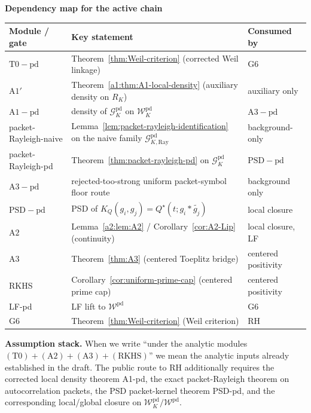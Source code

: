 \begin{center}
  \small\textbf{Dependency map for the active chain}
\end{center}
\begin{center}
  \small
  \begin{tabular}{lll}
    \hline
    Module / gate & Key statement & Consumed by \\
    \hline
    $\mathrm{T0\!-\!pd}$ & Theorem~\ref{thm:Weil-criterion} (corrected Weil linkage) & $\mathrm{G6}$ \\
    $\mathrm{A1'}$ & Theorem~\ref{a1:thm:A1-local-density} (auxiliary density on $R_K$) & auxiliary only \\
    $\mathrm{A1\!-\!pd}$ & density of $\mathcal G_K^{\mathrm{pd}}$ on $\mathcal W_K^{\mathrm{pd}}$ & $\mathrm{A3\!-\!pd}$ \\
    packet-Rayleigh-naive & Lemma~\ref{lem:packet-rayleigh-identification} on the naive family $\mathcal G_{K,\mathrm{Ray}}^{\mathrm{pd}}$ & background-only \\
    packet-Rayleigh-pd & Theorem~\ref{thm:packet-rayleigh-pd} on $\mathcal G_K^{\mathrm{pd}}$ & $\mathrm{PSD\!-\!pd}$ \\
    $\mathrm{A3\!-\!pd}$ & rejected-too-strong uniform packet-symbol floor route & background only \\
    $\mathrm{PSD\!-\!pd}$ & PSD of $K_Q(g_i,g_j)=Q^\star(t;g_i * \widetilde{g_j})$ & local closure \\
    $\mathrm{A2}$ & Lemma~\ref{a2:lem:A2} / Corollary~\ref{cor:A2-Lip} (continuity) & local closure, LF \\
    $\mathrm{A3}$ & Theorem~\ref{thm:A3} (centered Toeplitz bridge) & centered positivity \\
    RKHS & Corollary~\ref{cor:uniform-prime-cap} (centered prime cap) & centered positivity \\
    LF-pd & LF lift to $\mathcal W^{\mathrm{pd}}$ & $\mathrm{G6}$ \\
    $\mathrm{G6}$ & Theorem~\ref{thm:Weil-criterion} (Weil criterion) & RH \\
    \hline
  \end{tabular}
\end{center}

\noindent\textbf{Assumption stack.} When we write ``under the analytic modules $(\mathrm{T0})+(\mathrm{A2})+(\mathrm{A3})+(\mathrm{RKHS})$'' we mean the analytic inputs already established in the draft. The public route to RH additionally requires the corrected local density theorem \textup{A1-pd}, the exact packet-Rayleigh theorem on autocorrelation packets, the PSD packet-kernel theorem \textup{PSD-pd}, and the corresponding local/global closure on $\mathcal W_K^{\mathrm{pd}} / \mathcal W^{\mathrm{pd}}$.

